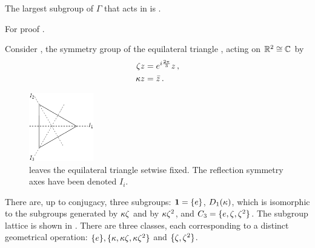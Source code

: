 \begin{lemma}
  The largest subgroup of $\Gamma$ that acts in \Fix{\Sigma} is \Nlz{\Sigma}.
  \label{lem:NlzActs}
\end{lemma}
For proof \cf {}.



\begin{example} %
Consider , the symmetry group of the equilateral triangle
, acting on $\mathbb{R}^{2}\cong\mathbb{C}^{}$ by
\begin{subequations}\label{eq:D3onR2}
\begin{align}	
  \zeta z &= e^{i\frac{2\pi}{3}} z\,,\\
  \kappa z  &= \bar{z}\,.
 \end{align}
\end{subequations}

\begin{figure}
\begin{center}
		\includegraphics[width=0.25\textwidth]{../figs/D3triangle}
\end{center}
\caption[D3 symmetry illustration.]{
    {\small
     leaves the equilateral triangle setwise fixed. The reflection symmetry axes have been denoted $I_i$.}}
\label{fig:D3triangle}
    \vspace*{-5pt}
\end{figure}

There are, up to conjugacy, three subgroups: $\mathbf{1}=\{e\}$, $D_1(\kappa)$,
which is isomorphic to the subgroups generated
by $\kappa\zeta$ and by $\kappa\zeta^2$, and $C_{3}=\{e,\zeta,\zeta^2\}$.
The subgroup lattice is shown in .
There are three classes, each corresponding to
a distinct geometrical operation: $\{e\},\{\kappa,\kappa\zeta,\kappa\zeta^2\}$
and $\{\zeta,\zeta^2\}$.


\end{example}


